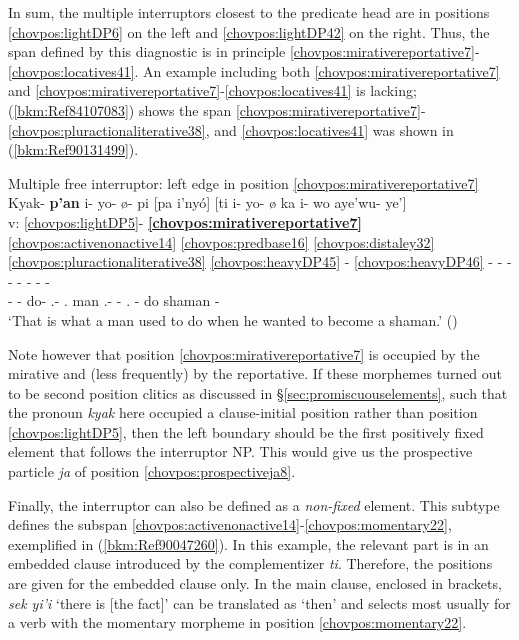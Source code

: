 \documentclass[output=paper]{langscibook}
\begin{document}
In sum, the multiple interruptors closest to the predicate head are in positions \ref{chovpos:lightDP6} on the left and \ref{chovpos:lightDP42} on the right. Thus, the span defined by this diagnostic is in principle \ref{chovpos:mirativereportative7}{}-\ref{chovpos:locatives41}. An example including both \ref{chovpos:mirativereportative7} and \ref{chovpos:mirativereportative7}{}-\ref{chovpos:locatives41} is lacking; (\ref{bkm:Ref84107083}) shows the span \ref{chovpos:mirativereportative7}{}-\ref{chovpos:pluractionaliterative38}, and \ref{chovpos:locatives41} was shown in (\ref{bkm:Ref90131499}). 

\ea\label{bkm:Ref84107083} Multiple free interruptor: left edge in position \ref{chovpos:mirativereportative7} \\
\glll {} Kyak- \textbf{p'an} i- yo- ø{}- pi [pa i'nyó] [ti i- yo- ø ka i- wo aye'wu- ye']\\ 
v: \ref {chovpos:lightDP5}- \textbf{\ref{chovpos:mirativereportative7}} \ref{chovpos:activenonactive14} \ref{chovpos:predbase16} \ref{chovpos:distaley32} \ref{chovpos:pluractionaliterative38} \ref{chovpos:heavyDP45} - \ref{chovpos:heavyDP46} - - - - - - - - \\ 
{} \Dem{}- \textbf{\Mir{}} \Third{}- do- \Ap.\Dist{}- \Rem.\Pst{} \Dem{} man \Comp{} \Third.\Irr{}- \Lv{}- \Ap.\Dist{} \Comp{} \Third{}- do shaman -\Irr{} \\
\glt `That is what a man used to do when he wanted to become a shaman.' (\citealt[134]{DraysonGomez2000})
\z 

Note however that position \ref{chovpos:mirativereportative7} is occupied by the mirative and (less frequently) by the reportative. If these morphemes turned out to be second position clitics as discussed in §\ref{sec:promiscuouselements}, such that the pronoun \textit{kyak} here occupied a clause-initial position rather than position \ref{chovpos:lightDP5}, then the left boundary should be the first positively fixed element that follows the interruptor NP. This would give us the prospective particle \textit{ja} of position \ref{chovpos:prospectiveja8}.

Finally, the interruptor can also be defined as a \textit{non-fixed} element. This subtype defines the subspan \ref{chovpos:activenonactive14}{}-\ref{chovpos:momentary22}, exemplified in (\ref{bkm:Ref90047260}). In this example, the relevant part is in an embedded clause introduced by the complementizer \textit{ti}. Therefore, the positions are given for the embedded clause only. In the main clause, enclosed in brackets, \textit{sek yi'i} `there is [the fact]' can be translated as `then' and selects most usually for a verb with the momentary morpheme in position \ref{chovpos:momentary22}.
\end{document}
